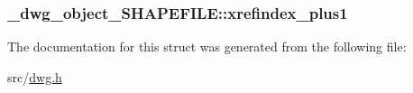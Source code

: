 \hypertarget{struct__dwg__object__SHAPEFILE_a05a64876d7e9aa9d35fd9fc1b3a71355}{
\subsubsection[{xrefindex\-\_\-plus1}]{ {\bf \-\_\-dwg\-\_\-object\-\_\-\-S\-H\-A\-P\-E\-F\-I\-L\-E\-::xrefindex\-\_\-plus1}}}\label{struct__dwg__object__SHAPEFILE_a05a64876d7e9aa9d35fd9fc1b3a71355}


\-The documentation for this struct was generated from the following file\-:\begin{DoxyCompactItemize}
\item 
src/\hyperlink{dwg_8h}{dwg.\-h}\end{DoxyCompactItemize}

